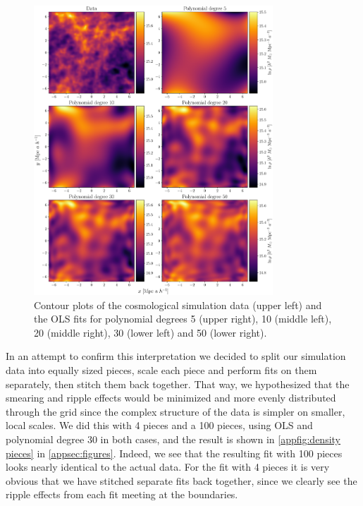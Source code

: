\documentclass[aps,pra,english,notitlepage,reprint,nofootinbib]{revtex4-1}  %
\begin{document}
\begin{figure}
  \vspace*{-5pt}
  \centering %
  \includegraphics[width=0.8\textwidth]{../figs/density_complexity.pdf}
  \caption{Contour plots of the cosmological simulation data (upper left) and the OLS fits for polynomial degrees 5 (upper right), 10 (middle left), 20 (middle right), 30 (lower left) and 50 (lower right).}\label{fig:density complexity}
  \vspace*{-5pt}
\end{figure}

In an attempt to confirm this interpretation we decided to split our simulation data into equally sized pieces, scale each piece and perform fits on them separately, then stitch them back together. That way, we hypothesized that the smearing and ripple effects would be minimized and more evenly distributed through the grid since the complex structure of the data is simpler on smaller, local scales. We did this with 4 pieces and a 100 pieces, using OLS and polynomial degree 30 in both cases, and the result is shown in \cref{appfig:density pieces} in \cref{appsec:figures}. Indeed, we see that the resulting fit with 100 pieces looks nearly identical to the actual data. For the fit with 4 pieces it is very obvious that we have stitched separate fits back together, since we clearly see the ripple effects from each fit meeting at the boundaries.
\end{document}
